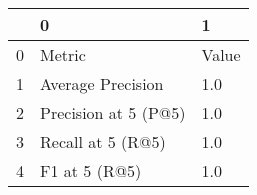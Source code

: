 \begin{tabular}{lll}
\toprule
{} &                     0 &      1 \\
\midrule
0 &                Metric &  Value \\
1 &     Average Precision &    1.0 \\
2 &  Precision at 5 (P@5) &    1.0 \\
3 &     Recall at 5 (R@5) &    1.0 \\
4 &         F1 at 5 (R@5) &    1.0 \\
\bottomrule
\end{tabular}

